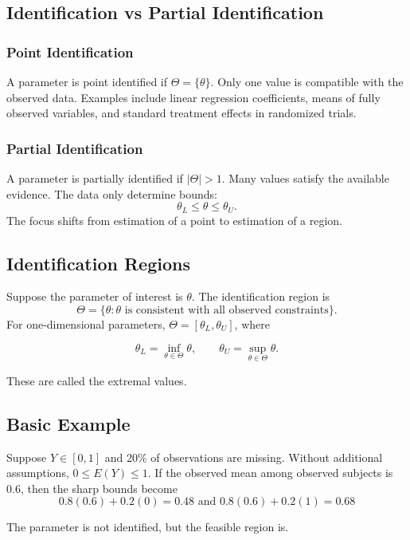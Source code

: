 \documentclass[11pt]{article}
\begin{document}
\subsection*{Identification vs Partial Identification}

\subsubsection*{Point Identification}

A parameter is point identified if $\Theta=\{\theta\}$. Only one value is compatible with the observed data.
Examples include linear regression coefficients, means of fully observed variables, and standard treatment effects in randomized trials.

\subsubsection*{Partial Identification}

A parameter is partially identified if $|\Theta|>1$. Many values satisfy the available evidence.
The data only determine bounds:
\[\theta_L\le\theta\le\theta_U.\]
The focus shifts from estimation of a point to estimation of a region.

\subsection*{Identification Regions}

Suppose the parameter of interest is $\theta$. The identification region is
\[\Theta=\{\theta:\theta \text{ is consistent with all observed constraints}\}.\]
For one-dimensional parameters, $\Theta=[\theta_L,\theta_U]$, where

\[\theta_L=\inf_{\theta\in\Theta}\theta,\qquad \theta_U=\sup_{\theta\in\Theta}\theta.\]

These are called the extremal values.

\subsection*{Basic Example}

Suppose $Y\in[0,1]$ and 20\% of observations are missing.
Without additional assumptions, $0\le E(Y)\le1$.
If the observed mean among observed subjects is 0.6, then the sharp bounds become
\[0.8(0.6)+0.2(0)=0.48 \text{ and } 0.8(0.6)+0.2(1)=0.68\]

The parameter is not identified, but the feasible region is.
\end{document}
